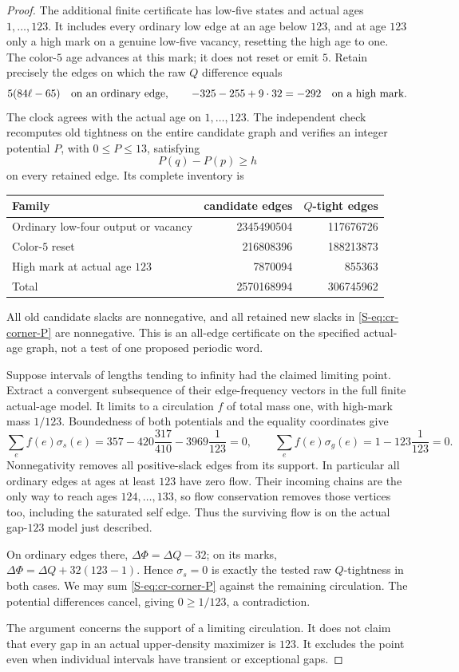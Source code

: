 \documentclass[11pt,reqno]{amsart}
\theoremstyle{plain}
\theoremstyle{plain}
\theoremstyle{plain}
\begin{document}
\begin{proof}
The additional finite certificate has low-five states and
actual ages $1,\ldots,123$. It includes every ordinary low
edge at an age below $123$, and at age $123$ only a high
mark on a genuine low-five vacancy, resetting the high age
to one. The color-$5$ age advances at this mark; it does not
reset or emit $5$. Retain precisely the edges on which the
raw $Q$ difference equals
\[
 5(84\ell-65)\quad\hbox{on an ordinary edge},\qquad
 -325-255+9\cdot32=-292\quad\hbox{on a high mark}.
\]
The clock agrees with the actual age on $1,\ldots,123$.
The independent check recomputes old tightness on the entire
candidate graph and verifies an integer potential $P$, with
$0\le P\le13$, satisfying
\begin{equation}\label{S-eq:cr-corner-P}
 P(q)-P(p)\ge h
\end{equation}
on every retained edge. Its complete inventory is
\begin{center}\small
\begin{tabular}{@{}lrr@{}}\toprule
Family&candidate edges&$Q$-tight edges\\\midrule
Ordinary low-four output or vacancy&2345490504&117676726\\
Color-$5$ reset&216808396&188213873\\
High mark at actual age $123$&7870094&855363\\\midrule
Total&2570168994&306745962\\\bottomrule
\end{tabular}
\end{center}
All old candidate slacks are nonnegative, and all retained
new slacks in \eqref{S-eq:cr-corner-P} are nonnegative. This is
an all-edge certificate on the specified actual-age graph,
not a test of one proposed periodic word.

Suppose intervals of lengths tending to infinity had the
claimed limiting point. Extract a convergent subsequence of
their edge-frequency vectors in the full finite actual-age
model. It limits to a circulation $f$ of total mass one,
with high-mark mass $1/123$. Boundedness of both potentials
and the equality coordinates give
\[
 \sum_e f(e)\sigma_s(e)
       =357-420\frac{317}{410}-3969\frac1{123}=0,
 \qquad
 \sum_e f(e)\sigma_g(e)=1-123\frac1{123}=0.
\]
Nonnegativity removes all positive-slack edges from its
support. In particular all ordinary edges at ages at least
$123$ have zero flow. Their incoming chains are the only
way to reach ages $124,\ldots,133$, so flow conservation
removes those vertices too, including the saturated self
edge. Thus the surviving flow is on the actual gap-$123$
model just described.

On ordinary edges there, $\Delta\Phi=\Delta Q-32$; on its
marks, $\Delta\Phi=\Delta Q+32(123-1)$. Hence
$\sigma_s=0$ is exactly the tested raw $Q$-tightness in
both cases. We may sum \eqref{S-eq:cr-corner-P} against the
remaining circulation. The potential differences cancel,
giving $0\ge1/123$, a contradiction.

The argument concerns the support of a limiting circulation.
It does not claim that every gap in an actual upper-density
maximizer is $123$. It excludes the point even when individual
intervals have transient or exceptional gaps.
\end{proof}
\end{document}
